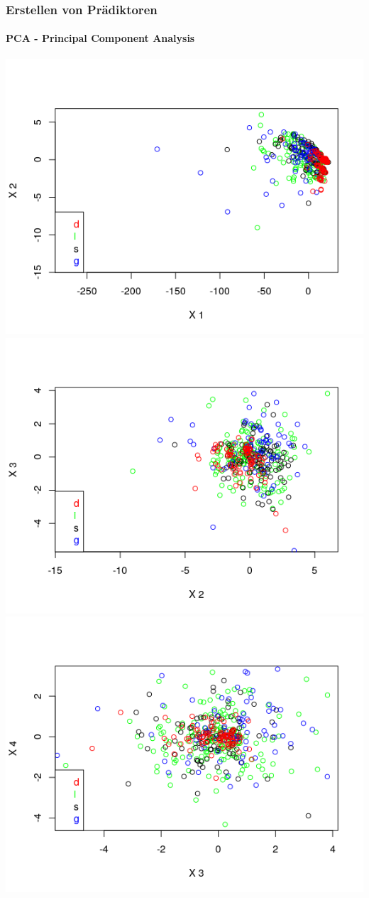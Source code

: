 \documentclass{beamer}
\begin{document}
\begin{frame}
 \frametitle{Erstellen von Prädiktoren}
 \framesubtitle{PCA - Principal Component Analysis}
 \includegraphics[scale=0.36]{PCA_1_2.png}
 \includegraphics[scale=0.36]{PCA_2_3.png}
 \includegraphics[scale=0.36]{PCA_3_4.png}

\end{frame}
\end{document}
